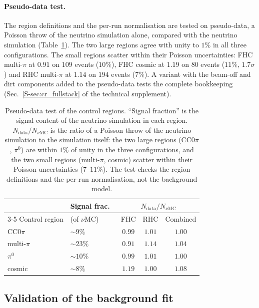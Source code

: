 \documentclass[11pt,a4paper]{article}
\newcommand{\suppref}[2]{#1~\ref{S-#2} of the technical supplement}
\begin{document}
\paragraph{Pseudo-data test.}
The region definitions and the per-run normalisation are tested on pseudo-data, a Poisson throw of the neutrino simulation alone, compared with the neutrino
simulation (Table~\ref{tab:sidebands}). The two large regions agree with unity to $1\%$ in all three
configurations. The small regions scatter within their Poisson uncertainties: FHC multi-$\pi$ at
$0.91$ on $109$ events ($10\%$), FHC cosmic at $1.19$ on $80$ events ($11\%$, $1.7\sigma$) and RHC
multi-$\pi$ at $1.14$ on $194$ events ($7\%$). A variant with the beam-off and dirt components added
to the pseudo-data tests the complete bookkeeping (\suppref{Sec.}{sec:cr_fullstack}).

\begin{table}[H]
  \centering
  \caption{Pseudo-data test of the control regions. ``Signal fraction'' is the signal content of
    the neutrino simulation in each region. $N_\mathrm{data}/N_{\nu\mathrm{MC}}$ is the ratio of a
    Poisson throw of the neutrino simulation to the simulation itself: the two large regions
    (CC$0\pi$, $\pi^0$) are within $1\%$ of unity in the three configurations, and the two small
    regions (multi-$\pi$, cosmic) scatter within their Poisson uncertainties ($7$--$11\%$). The test
    checks the region definitions and the per-run normalisation, not the background model.}
  \label{tab:sidebands}
  \begin{tabular}{llccc}
    \toprule
    & Signal frac.\ & \multicolumn{3}{c}{$N_\mathrm{data}/N_{\nu\mathrm{MC}}$} \\
    \cmidrule(lr){3-5}
    Control region & (of $\nu$MC) & FHC & RHC & Combined \\
    \midrule
    CC$0\pi$      & $\sim9\%$ & $0.99$ & $1.01$ & $1.00$ \\
    multi-$\pi$   & $\sim23\%$ & $0.91$ & $1.14$ & $1.04$ \\
    $\pi^0$       & $\sim10\%$ & $0.99$ & $1.01$ & $1.00$ \\
    cosmic        & $\sim8\%$ & $1.19$ & $1.00$ & $1.08$ \\
    \bottomrule
  \end{tabular}
\end{table}



\subsection{Validation of the background fit}
\end{document}
